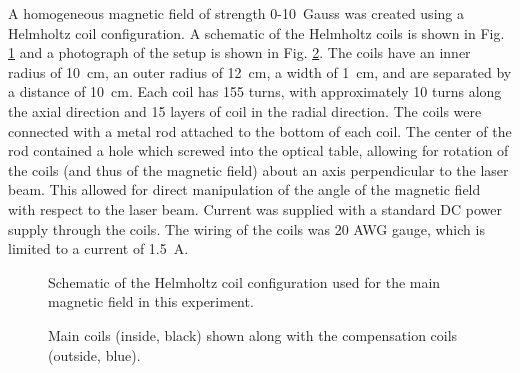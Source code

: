 A homogeneous magnetic field of strength 0-\SI{10}{ Gauss} was created using a Helmholtz coil configuration. A schematic of the Helmholtz coils is shown in Fig. \ref{fig:helmholtzcoils} and a photograph of the setup is shown in Fig. \ref{fig:actualcoils}. The coils have an inner radius of \SI{10}{\centi \meter}, an outer radius of \SI{12}{\centi \meter}, a width of \SI{1}{\centi \meter}, and are separated by a distance of \SI{10}{\centi \meter}. Each coil has 155 turns, with approximately 10 turns along the axial direction and 15 layers of coil in the radial direction. The coils were connected with a metal rod attached to the bottom of each coil. The center of the rod contained a hole which screwed into the optical table, allowing for rotation of the coils (and thus of the magnetic field) about an axis perpendicular to the laser beam. This allowed for direct manipulation of the angle of the magnetic field with respect to the laser beam. Current was supplied with a standard DC power supply through the coils. The wiring of the coils was 20 AWG gauge, which is limited to a current of \SI{1.5}{ A}.

\begin{figure}[htpb]
	\centering
	
	\caption{Schematic of the Helmholtz coil configuration used for the main magnetic field in this experiment.}
	\label{fig:helmholtzcoils}
\end{figure}



\begin{figure}[htpb]
	\centering
	\caption{Main coils (inside, black) shown along with the compensation coils (outside, blue).}
	\label{fig:actualcoils}
\end{figure}

